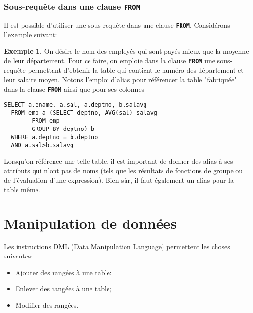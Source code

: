 \documentclass[a4paper, 12pt]{report}
\newcommand{\textSQL}[1]{\texttt{\textbf{#1}}}
\theoremstyle{definition} \newtheorem{ex}{Exemple}
\begin{document}
\subsection{Sous-requête dans une clause \textSQL{FROM}}
Il est possible d'utiliser une sous-requête dans une clause \textSQL{FROM}. Considérons l'exemple suivant:
\begin{ex}
 On désire le nom des employés qui sont payés mieux que la moyenne de leur département. Pour ce faire, on emploie dans la clause \textSQL{FROM} une sous-requête permettant d'obtenir la table qui contient le numéro des département et leur salaire moyen. Notons l'emploi d'alias pour référencer la table "fabriquée" dans la clause \textSQL{FROM} ainsi que pour ses colonnes.
\begin{lstlisting}[frame=single]
SELECT a.ename, a.sal, a.deptno, b.salavg
  FROM emp a (SELECT deptno, AVG(sal) salavg
	    FROM emp
	    GROUP BY deptno) b
  WHERE a.deptno = b.deptno
  AND a.sal>b.salavg
\end{lstlisting}
\end{ex}

Lorsqu'on référence une telle table, il est important de donner des alias à ses attributs qui n'ont pas de noms (tels que les résultats de fonctions de groupe ou de l'évaluation d'une expression). Bien sûr, il faut également un alias pour la table même.

\chapter{Manipulation de données}
Les instructions DML (Data Manipulation Language) permettent les choses suivantes: \begin{itemize}
\item Ajouter des rangées à une table;
\item Enlever des rangées à une table;
\item Modifier des rangées. \end{itemize}
\end{document}
